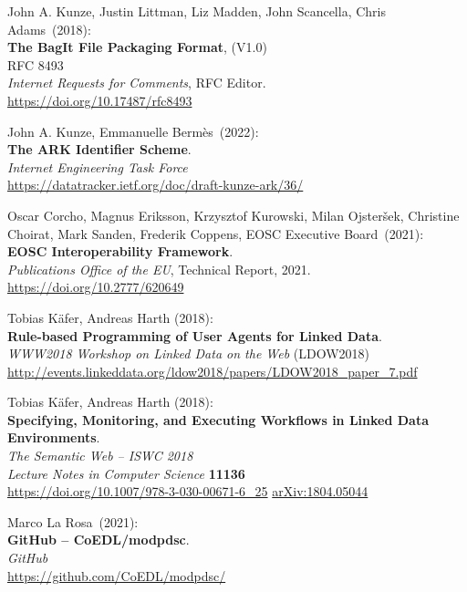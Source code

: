 \begin{thebibliography}{9}
John A. Kunze, Justin Littman, Liz Madden, John Scancella, Chris Adams~(2018): \\
\textbf{The BagIt File Packaging Format}, (V1.0)\\
RFC 8493\\
\emph{Internet Requests for Comments}, RFC Editor.\\
\url{https://doi.org/10.17487/rfc8493}

John A. Kunze, Emmanuelle Bermès~(2022): \\
\textbf{{The ARK Identifier Scheme}}.\\
\emph{Internet Engineering Task Force}\\
\url{https://datatracker.ietf.org/doc/draft-kunze-ark/36/}

Oscar Corcho, Magnus Eriksson, Krzysztof Kurowski, Milan Ojsteršek, Christine Choirat, Mark Sanden, Frederik Coppens, EOSC Executive Board~(2021): \\
\textbf{EOSC Interoperability Framework}.\\
\emph{Publications Office of the EU}, Technical Report, 2021.\\
\url{https://doi.org/10.2777/620649}

Tobias Käfer, Andreas Harth (2018): \\
\textbf{Rule-based Programming of User Agents for Linked Data}.\\
\emph{WWW2018 Workshop on Linked Data on the Web} (LDOW2018) \\
\url{http://events.linkeddata.org/ldow2018/papers/LDOW2018_paper_7.pdf}

Tobias Käfer, Andreas Harth (2018):\\
\textbf{Specifying, Monitoring, and Executing Workflows in Linked Data Environments}.\\
\emph{The Semantic Web – ISWC 2018}\\
\emph{Lecture Notes in Computer Science} \textbf{11136}\\
\url{https://doi.org/10.1007/978-3-030-00671-6_25}
\href{https://arxiv.org/abs/1804.05044}{arXiv:1804.05044}

Marco La Rosa~(2021): \\
\textbf{GitHub -- CoEDL/modpdsc}. \\
\emph{GitHub} \\
\url{https://github.com/CoEDL/modpdsc/}


\end{thebibliography}
